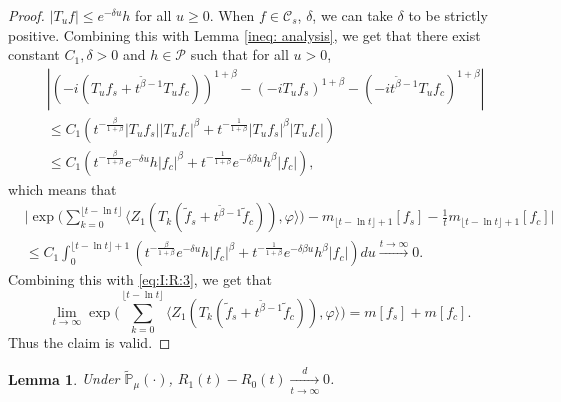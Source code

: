\documentclass[12pt,a4paper]{amsart}
\theoremstyle{plain}
\newtheorem{lem}[thm]{Lemma}
\theoremstyle{definition}
\numberwithin{equation}{section}
\begin{document}
\begin{proof}
 $|T_uf|\leq e^{-\delta u}h$ for all $u\geq 0$. When $f\in \mathcal C_s$, $\delta$, we can take
 $\delta$ to be  strictly positive.
Combining this with
Lemma \ref{ineq: analysis}, we get that there exist constant $C_1,\delta>0$ and $h\in \mathcal P$ such that for all $u>0$,
\begin{align}
  &|(-i(T_uf_s+t^{\tilde{\beta}-1}T_uf_c))^{1+\beta}-(-iT_uf_s)^{1+\beta}-(-it^{\tilde{\beta}-1}T_uf_c)^{1+\beta}|\\
&\leq C_1(t^{-\frac{\beta}{1+\beta}}|T_uf_s||T_uf_c|^{\beta}+t^{-\frac{1}{1+\beta}}|T_uf_s|^{\beta}|T_uf_c|)\\
&\leq C_1(t^{-\frac{\beta}{1+\beta}}e^{-\delta u}h|f_c|^{\beta}+t^{-\frac{1}{1+\beta}}e^{-\delta\beta u}h^{\beta}|f_c|),
\end{align}
which means that
\begin{align}
&\Big|\exp\Big(\sum_{k=0}^{\lfloor t-\ln t \rfloor} \langle Z_1(T_{k}(\tilde f_s+t^{\tilde{\beta}-1}\tilde{f}_c)), \varphi\rangle \Big)-m_{\lfloor t-\ln t \rfloor+1}[f_s]-\frac{1}{t}m_{\lfloor t-\ln t \rfloor+1}[f_c]\Big|\\
&\leq C_1\int_0^{\lfloor t-\ln t \rfloor+1}(t^{-\frac{\beta}{1+\beta}}e^{-\delta u}h|f_c|^{\beta}+t^{-\frac{1}{1+\beta}}e^{-\delta\beta u}h^{\beta}|f_c|)du\xrightarrow{t\rightarrow \infty} 0.
\end{align}
Combining this with \eqref{eq:I:R:3}, we get that
\[
\lim_{t\rightarrow \infty}\exp\Big(\sum_{k=0}^{\lfloor t-\ln t \rfloor} \langle Z_1(T_{k}(\tilde f_s+t^{\tilde{\beta}-1}\tilde{f}_c)), \varphi\rangle \Big) = m[f_s]+m[f_c].
\]
Thus the claim is valid.
\end{proof}
\begin{lem}\label{lem: U1-U0T}
Under $\mathbb{\widetilde{P}}_{\mu}(\cdot)$,
 $R_1(t)-R_0(t)\xrightarrow[t\to \infty]{d}0$.
\end{lem}
\end{document}
